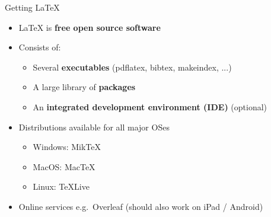 \begin{frame}{Getting LaTeX}
\begin{itemize}
	\pause\item LaTeX is \textbf{free open source software}
	\pause\item Consists of:
	\begin{itemize}
		\pause\item Several \textbf{executables} (pdflatex, bibtex, makeindex, ...)
		\pause\item A large library of \textbf{packages}
		\pause\item An \textbf{integrated development environment (IDE)} (optional)
	\end{itemize}
	\pause\item Distributions available for all major OSes
	\begin{itemize}
		\item Windows: MikTeX
		\item MacOS: MacTeX
		\item Linux: TeXLive
	\end{itemize}
	\pause\item Online services e.g.\ Overleaf (should also work on iPad / Android)
\end{itemize}
\end{frame}

